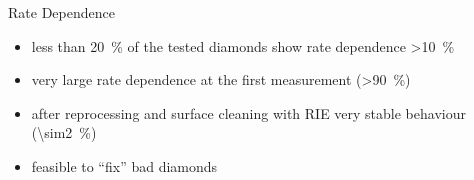 \begin{frame}{Rate Dependence}

	
	\begin{itemize}\itemfill
		\item less than \SI{20}{\%} of the tested diamonds show rate dependence \SI{>10}{\%}
		\item very large rate dependence at the first measurement (\SI{>90}{\%})
		\item after reprocessing and surface cleaning with RIE very stable behaviour (\SI{\sim2}{\%})
		\item feasible to ``fix'' bad diamonds
	\end{itemize}

\end{frame}

